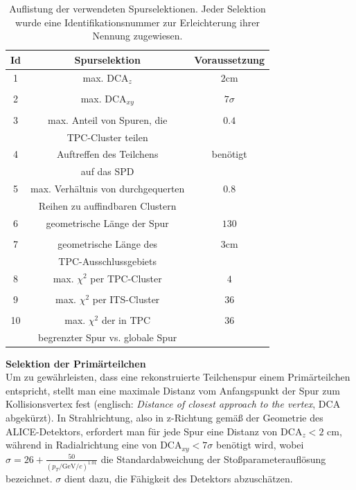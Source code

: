 \documentclass[12pt,a4paper]{report}
\begin{document}
\begin{table}
\centering
\begin{tabular}{|c|c|c|}
\hline
\textbf{Id} & \textbf{Spurselektion} & \textbf{Voraussetzung} \\
\hline
1 & max. $\mathrm{DCA}_{z}$ & $2$cm\\
 &  & \\
\hline
2 & max. $\mathrm{DCA}_{xy}$ & $7\sigma$\\
 &  & \\
\hline
3 & max. Anteil von Spuren, die & $0.4$\\
& TPC-Cluster teilen & \\
\hline
4 & Auftreffen des Teilchens & benötigt\\
 & auf das SPD & \\
\hline
5 & max. Verhältnis von durchgequerten & $0.8$\\
  &  Reihen zu auffindbaren Clustern & \\
\hline
6 & geometrische Länge der Spur & $130$\\
 &  & \\
\hline
7 & geometrische Länge des & $3$cm\\
 & TPC-Ausschlussgebiets & \\
\hline
8 & max. $\chi^2$ per TPC-Cluster & $4$\\
 &  & \\
\hline
9 & max. $\chi^2$ per ITS-Cluster  & $36$\\
 &  & \\
\hline
10 & max. $\chi^2$ der in TPC  & $36$\\
 &  begrenzter Spur vs. globale Spur & \\
\hline
\end{tabular}
\caption{Auflistung der verwendeten Spurselektionen. Jeder Selektion wurde eine Identifikationsnummer zur Erleichterung ihrer Nennung zugewiesen.}
\label{tab:Cuts}
\end{table}
\textbf{Selektion der Primärteilchen}\\
Um zu gewährleisten, dass eine rekonstruierte Teilchenspur einem Primärteilchen entspricht, stellt man eine maximale Distanz vom Anfangspunkt der Spur zum Kollisionsvertex fest (englisch: \textit{Distance of closest approach to the vertex}, DCA abgekürzt). In Strahlrichtung, also in z-Richtung gemäß der Geometrie des ALICE-Detektors, erfordert man für jede Spur eine Distanz von $\mathrm{DCA}_{z} < 2$ cm, während in Radialrichtung eine von $\mathrm{DCA}_{xy} < 7\sigma$ benötigt wird, wobei $\sigma = 26 + \tfrac{50}{(p_{T}/\mathrm{GeV}/c)^{1.01}}$ die Standardabweichung der Stoßparameterauflösung bezeichnet. $\sigma$ dient dazu, die Fähigkeit des Detektors abzuschätzen.\\ \\
\end{document}
